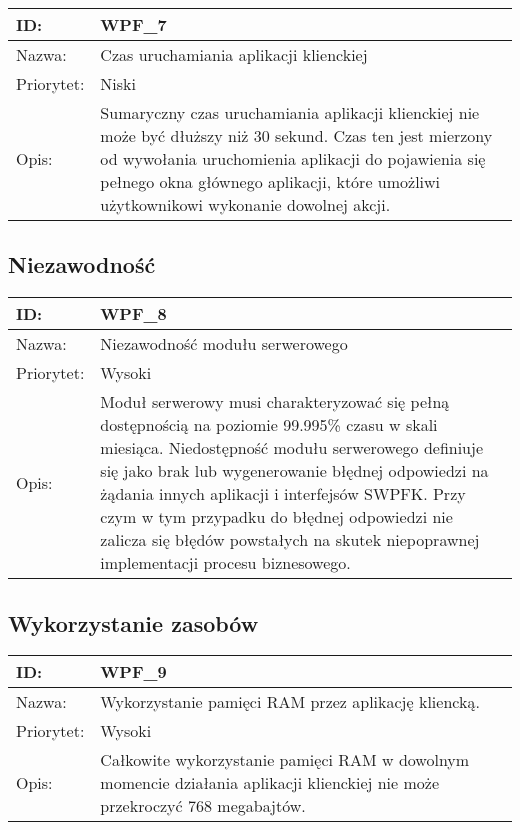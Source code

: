 \begin{center}
\begin{tabular}[h]{|p{1.6cm}|p{13.5cm}|}
\hline
ID: & WPF\_7 \\ \hline
Nazwa: & Czas uruchamiania aplikacji klienckiej \\ \hline
Priorytet: & Niski \\ \hline
Opis: & Sumaryczny czas uruchamiania aplikacji klienckiej nie może być dłuższy niż 30 sekund. Czas ten jest mierzony od wywołania uruchomienia aplikacji do pojawienia się pełnego okna głównego aplikacji, które umożliwi użytkownikowi wykonanie dowolnej akcji. \\
\hline
\end{tabular}
\end{center}

\subsection{Niezawodność}
\begin{center}
\begin{tabular}[h]{|p{1.6cm}|p{13.5cm}|}
\hline
ID: & WPF\_8 \\ \hline
Nazwa: & Niezawodność modułu serwerowego \\ \hline
Priorytet: & Wysoki \\ \hline
Opis: & Moduł serwerowy musi charakteryzować się pełną dostępnością na poziomie 99.995\% czasu w skali miesiąca. Niedostępność modułu serwerowego definiuje się jako brak lub wygenerowanie błędnej odpowiedzi na żądania innych aplikacji i interfejsów SWPFK. Przy czym w tym przypadku do błędnej odpowiedzi nie zalicza się błędów powstałych na skutek niepoprawnej implementacji procesu biznesowego.  \\
\hline
\end{tabular}
\end{center}

\subsection{Wykorzystanie zasobów}
\begin{center}
\begin{tabular}[h]{|p{1.6cm}|p{13.5cm}|}
\hline
ID: & WPF\_9 \\ \hline
Nazwa: & Wykorzystanie pamięci RAM przez aplikację kliencką. \\ \hline
Priorytet: & Wysoki \\ \hline
Opis: & Całkowite wykorzystanie pamięci RAM w dowolnym momencie działania aplikacji klienckiej nie może przekroczyć 768 megabajtów. \\
\hline
\end{tabular}
\end{center}

